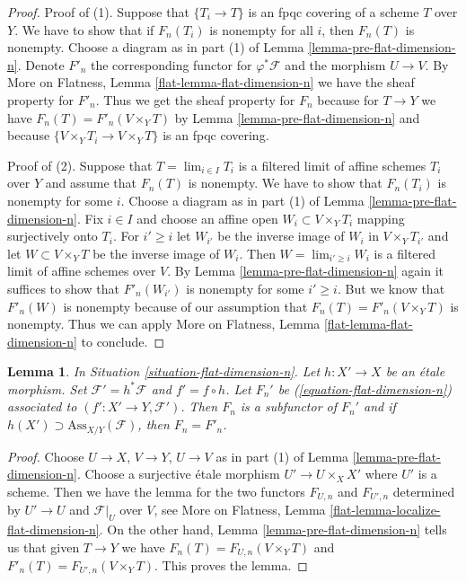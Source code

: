 \documentclass{stacks-project}
\theoremstyle{plain}
\newtheorem{lemma}[subsection]{Lemma}
\theoremstyle{definition}
\theoremstyle{remark}
\numberwithin{equation}{subsection}
\def\lim{\mathop{\mathrm{lim}}\nolimits}
\begin{document}
\begin{proof}
Proof of (1). Suppose that $\{T_i \to T\}$ is an fpqc covering of
a scheme $T$ over $Y$. We have to show that if $F_n(T_i)$ is nonempty
for all $i$, then $F_n(T)$ is nonempty.
Choose a diagram as in part (1) of Lemma \ref{lemma-pre-flat-dimension-n}.
Denote $F'_n$ the corresponding functor for
$\varphi^*\mathcal{F}$ and the morphism $U \to V$.
By More on Flatness, Lemma \ref{flat-lemma-flat-dimension-n}
we have the sheaf property for $F'_n$.
Thus we get the sheaf property for $F_n$ because
for $T \to Y$ we have $F_n(T) = F'_n(V \times_Y T)$
by Lemma \ref{lemma-pre-flat-dimension-n}
and because $\{V \times_Y T_i \to V \times_Y T\}$
is an fpqc covering.

\medskip\noindent
Proof of (2). Suppose that $T = \lim_{i \in I} T_i$ is a filtered limit
of affine schemes $T_i$ over $Y$ and assume that $F_n(T)$ is nonempty.
We have to show that $F_n(T_i)$ is nonempty for some $i$.
Choose a diagram as in
part (1) of Lemma \ref{lemma-pre-flat-dimension-n}.
Fix $i \in I$ and choose an affine open $W_i \subset V \times_Y T_i$
mapping surjectively onto $T_i$. For $i' \geq i$ let $W_{i'}$
be the inverse image of $W_i$ in $V \times_Y T_{i'}$ and
let $W \subset V \times_Y T$ be the inverse image of $W_i$.
Then $W = \lim_{i' \geq i} W_i$ is a filtered limit of affine
schemes over $V$. By
Lemma \ref{lemma-pre-flat-dimension-n} again
it suffices to show that $F'_n(W_{i'})$ is nonempty for
some $i' \geq i$. But we know that $F'_n(W)$ is nonempty
because of our assumption that $F_n(T) = F'_n(V \times_Y T)$
is nonempty. Thus we can apply
More on Flatness, Lemma \ref{flat-lemma-flat-dimension-n}
to conclude.
\end{proof}

\begin{lemma}
\label{lemma-localize-flat-dimension-n}
In Situation \ref{situation-flat-dimension-n}.
Let $h : X' \to X$ be an \'etale morphism.
Set $\mathcal{F}' = h^*\mathcal{F}$ and $f' = f \circ h$.
Let $F_n'$ be (\ref{equation-flat-dimension-n})
associated to $(f' : X' \to Y, \mathcal{F}')$.
Then $F_n$ is a subfunctor of $F_n'$ and if
$h(X') \supset \text{Ass}_{X/Y}(\mathcal{F})$, then $F_n = F'_n$.
\end{lemma}

\begin{proof}
Choose $U \to X$, $V \to Y$, $U \to V$ as in part (1) of
Lemma \ref{lemma-pre-flat-dimension-n}. Choose a surjective
\'etale morphism $U' \to U \times_X X'$ where $U'$ is a scheme.
Then we have the lemma for the two functors
$F_{U, n}$ and $F_{U', n}$ determined by $U' \to U$ and $\mathcal{F}|_U$
over $V$, see
More on Flatness, Lemma \ref{flat-lemma-localize-flat-dimension-n}.
On the other hand, Lemma \ref{lemma-pre-flat-dimension-n}
tells us that given $T \to Y$ we have
$F_n(T) = F_{U, n}(V \times_Y T)$
and
$F'_n(T) = F_{U', n}(V \times_Y T)$.
This proves the lemma.
\end{proof}
\end{document}
